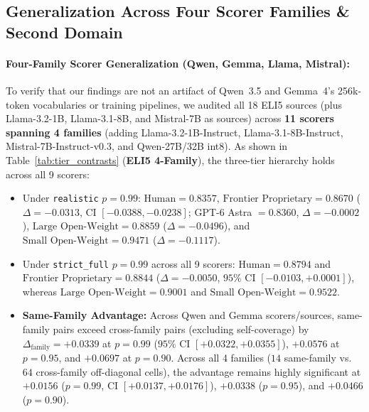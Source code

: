 \documentclass[11pt,a4paper,twocolumn]{article}
\begin{document}
\subsection{Generalization Across Four Scorer Families \& Second Domain}
\label{sec:expanded_scorers}

\paragraph{Four-Family Scorer Generalization (Qwen, Gemma, Llama, Mistral):}
To verify that our findings are not an artifact of Qwen~3.5 and Gemma~4's 256k-token vocabularies or training pipelines, we audited all 18 ELI5 sources (plus Llama-3.2-1B, Llama-3.1-8B, and Mistral-7B as sources) across \textbf{11 scorers spanning 4 families} (adding Llama-3.2-1B-Instruct, Llama-3.1-8B-Instruct, Mistral-7B-Instruct-v0.3, and Qwen-27B/32B int8).
As shown in Table~\ref{tab:tier_contrasts} (\textbf{ELI5 4-Family}), the three-tier hierarchy holds across all 9 scorers:
\begin{itemize}
    \item Under \texttt{realistic} $p=0.99$: $\text{Human} = 0.8357$, $\text{Frontier Proprietary} = 0.8670$ ($\Delta = -0.0313$, CI $[-0.0388, -0.0238]$; GPT-6 Astra $= 0.8360$, $\Delta = -0.0002$), $\text{Large Open-Weight} = 0.8859$ ($\Delta = -0.0496$), and $\text{Small Open-Weight} = 0.9471$ ($\Delta = -0.1117$).
    \item Under \texttt{strict\_full} $p=0.99$ across all 9 scorers: $\text{Human} = 0.8794$ and $\text{Frontier Proprietary} = 0.8844$ ($\Delta = -0.0050$, $95\%$ CI $[-0.0103, +0.0001]$), whereas $\text{Large Open-Weight} = 0.9001$ and $\text{Small Open-Weight} = 0.9522$.
    \item \textbf{Same-Family Advantage:} Across Qwen and Gemma scorers/sources, same-family pairs exceed cross-family pairs (excluding self-coverage) by $\Delta_{\text{family}} = +0.0339$ at $p=0.99$ ($95\%$ CI $[+0.0322, +0.0355]$), $+0.0576$ at $p=0.95$, and $+0.0697$ at $p=0.90$. Across all 4 families ($14$ same-family vs.\ $64$ cross-family off-diagonal cells), the advantage remains highly significant at $+0.0156$ ($p=0.99$, CI $[+0.0137, +0.0176]$), $+0.0338$ ($p=0.95$), and $+0.0466$ ($p=0.90$).
\end{itemize}
\end{document}
